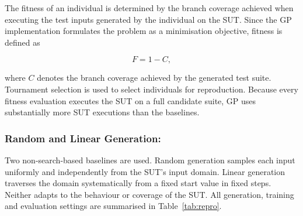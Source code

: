 \documentclass[runningheads]{llncs}
\begin{document}
The fitness of an individual is determined by the branch coverage achieved when executing the test inputs generated by the individual on the SUT. Since the GP implementation formulates the problem as a minimisation objective, fitness is defined as

\begin{equation}
F = 1-C,
\end{equation}

where $C$ denotes the branch coverage achieved by the generated test suite. Tournament selection is used to select individuals for reproduction. Because every fitness evaluation executes the SUT on a full candidate suite, GP uses substantially more SUT executions than the baselines.

\subsubsection{Random and Linear Generation:}
Two non-search-based baselines are used. Random generation samples each input uniformly and independently from the SUT's input domain. Linear generation traverses the domain systematically from a fixed start value in fixed steps. Neither adapts to the behaviour or coverage of the SUT. All generation, training and evaluation settings are summarised in Table~\ref{tab:repro}.
\end{document}
